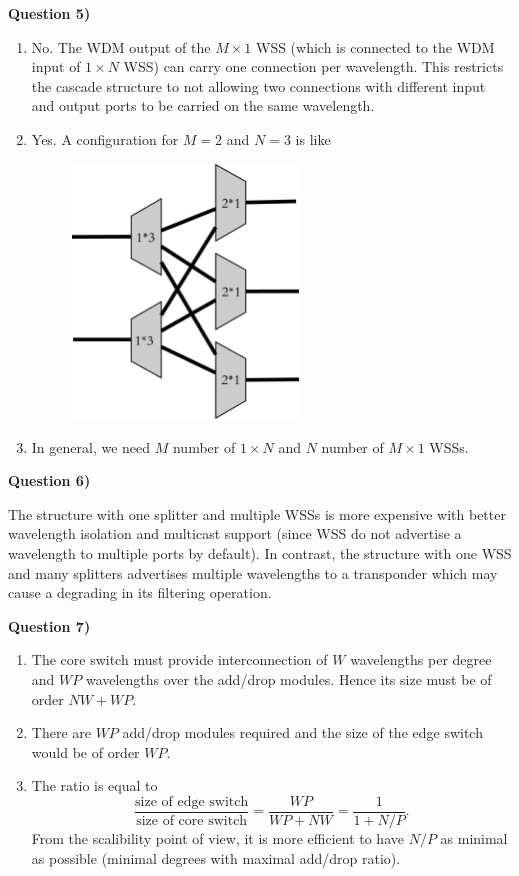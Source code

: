 \documentclass[10pt,letterpaper]{article}
\newcommand{\Q}[1]{\textbf{Question #1)}}
\begin{document}
\Q5

\begin{enumerate}[label=\alph*)]
\item
No. The WDM output of the $M\times 1$ WSS (which is connected to the WDM input of $1\times N$ WSS) can carry one connection per wavelength. This restricts the cascade structure to not allowing two connections with different input and output ports to be carried on the same wavelength.
\item
Yes. A configuration for $M=2$ and $N=3$ is like
\begin{figure}[h]
\centering
\includegraphics[width=60mm]{M_in_N_WSS}
\end{figure}
\item
In general, we need $M$ number of $1\times N$ and $N$ number of $M\times 1$ WSSs.
\end{enumerate}

\Q6

The structure with one splitter and multiple WSSs is more expensive with better wavelength isolation and multicast support (since WSS do not advertise a wavelength to multiple ports by default). In contrast, the structure with one WSS and many splitters advertises multiple wavelengths to a transponder which may cause a degrading in its filtering operation.

\Q7

\begin{enumerate}[label=\alph*)]
\item
The core switch must provide interconnection of $W$ wavelengths per degree and $WP$ wavelengths over the add/drop modules. Hence its size must be of order $NW+WP$.
\item
There are $WP$ add/drop modules required and the size of the edge switch would be of order $WP$.
\item
The ratio is equal to
$$
\frac{\text{size of edge switch}}{\text{size of core switch}}=\frac{WP}{WP+NW}=\frac{1}{1+N/P}.
$$
From the scalibility point of view, it is more efficient to have $N/P$ as minimal as possible (minimal degrees with maximal add/drop ratio).
\end{enumerate}
\end{document}
